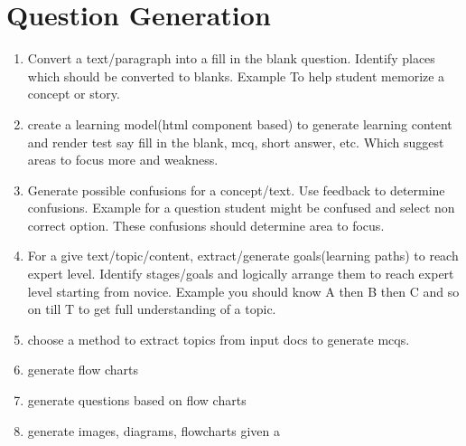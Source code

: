 \section{Question Generation}
    \begin{enumerate}
        \item Convert a text/paragraph into a fill in the blank question. Identify places which should be converted to blanks. Example To help student memorize a concept or story. 
        \item create a learning model(html component based) to generate learning content and render test say fill in the blank, mcq, short answer, etc. Which suggest areas to focus more and weakness.
        \item Generate possible confusions for a concept/text. Use feedback to determine confusions. Example for a question student might be confused and select non correct option. These confusions should determine area to focus. 
        \item For a give text/topic/content, extract/generate goals(learning paths) to reach expert level. Identify stages/goals and logically arrange them to reach expert level starting from novice. Example you should know A then B then C and so on till T to get full understanding of a topic.
        \item choose a method to extract topics from input docs to generate mcqs. 
        \item generate flow charts
        \item generate questions based on flow charts
        \item generate images, diagrams, flowcharts given a 
    \end{enumerate}
